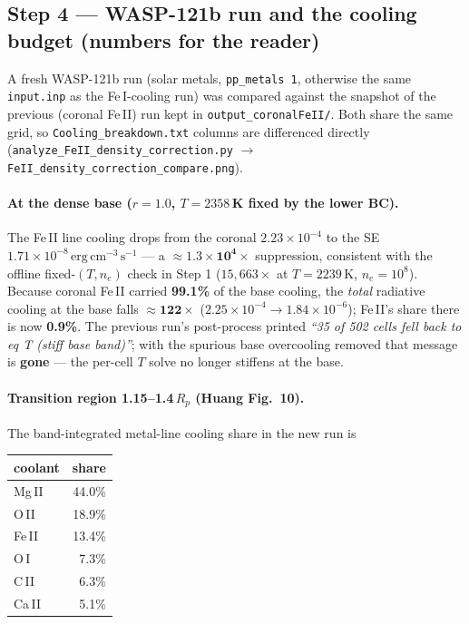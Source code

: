 \documentclass[english,a4paper]{kiseon_memo}
\begin{document}
\subsection{Step 4 --- WASP-121b run and the cooling budget (numbers for the reader)}
A fresh WASP-121b run (solar metals, \verb|pp_metals 1|, otherwise the same
\texttt{input.inp} as the Fe\,I-cooling run) was compared against the snapshot of
the previous (coronal Fe\,II) run kept in \texttt{output\_coronalFeII/}. Both
share the same grid, so \texttt{Cooling\_breakdown.txt} columns are differenced
directly (\texttt{analyze\_FeII\_density\_correction.py} \(\rightarrow\)
\texttt{FeII\_density\_correction\_compare.png}).

\paragraph{At the dense base (\(r = 1.0\), \(T = 2358\,\)K fixed by the lower BC).}
The Fe\,II line cooling drops from the coronal \(2.23\!\times\!10^{-4}\) to the SE
\(1.71\!\times\!10^{-8}\,\mathrm{erg\,cm^{-3}\,s^{-1}}\) --- a
\(\boldsymbol{\approx}\mathbf{1.3\!\times\!10^4\times}\) suppression, consistent
with the offline fixed-\((T, n_e)\) check in Step 1 (\(15{,}663\times\) at
\(T = 2239\,\)K, \(n_e = 10^8\)). Because coronal Fe\,II carried \textbf{99.1\%}
of the base cooling, the \emph{total} radiative cooling at the base falls
\(\boldsymbol{\approx}\mathbf{122\times}\) (\(2.25\!\times\!10^{-4} \rightarrow
1.84\!\times\!10^{-6}\)); Fe\,II's share there is now \textbf{0.9\%}. The
previous run's post-process printed \emph{``35 of 502 cells fell back to eq T
(stiff base band)''}; with the spurious base overcooling removed that message is
\textbf{gone} --- the per-cell \(T\) solve no longer stiffens at the base.

\paragraph{Transition region 1.15--1.4\,\(R_p\) (Huang Fig.~10).}
The band-integrated metal-line cooling share in the new run is

\begin{center}
\begin{tabular}{lr}
\hline
coolant & share \\
\hline
Mg\,II & 44.0\% \\
O\,II  & 18.9\% \\
Fe\,II & 13.4\% \\
O\,I   &  7.3\% \\
C\,II  &  6.3\% \\
Ca\,II &  5.1\% \\
\hline
\end{tabular}
\end{center}
\end{document}
